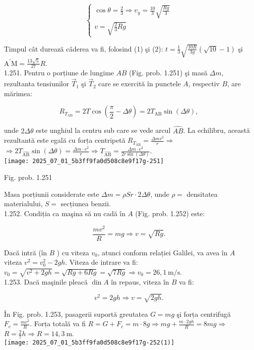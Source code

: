 \[
\left\{\begin{array}{l}
\cos \theta=\frac{2}{3} \Rightarrow v_{y}=\frac{10}{3} \sqrt{\frac{R g}{3}}  \tag{2}\\
v=\sqrt{\frac{2}{3} R g}
\end{array}\right.
\]

Timpul cât durează cǎderea va fi, folosind (1) şi (2): $t=\frac{1}{3} \sqrt{\frac{10 R}{3 g}}(\sqrt{10}-1)$ şi $\mathrm{A}^{\prime} \mathrm{M}=\frac{13 \sqrt{5}}{27} R$.\\
1.251. Pentru o porțiune de lungime $A B$ (Fig. prob. 1.251) şi masă $\Delta m$, rezultanta tensiunilor $\vec{T}_{1}$ şi $\vec{T}_{2}$ care se exercită în punctele $A$, respectiv $B$, are mărimea:

$$
R_{T_{\mathrm{AB}}}=2 T \cos \left(\frac{\pi}{2}-\Delta \theta\right)=2 T_{\mathrm{AB}} \sin (\Delta \theta),
$$

unde $2 \Delta \theta$ este unghiul la centru sub care se vede arcul $\hat{A B}$. La echilibru, această rezultantă este egală cu forța centripetă $R_{T_{\mathrm{AB}}}=\frac{\Delta m v^{2}}{r} \Rightarrow$\\
$\Rightarrow 2 T_{\hat{\mathrm{AB}}} \sin (\Delta \theta)=\frac{\Delta m \cdot v^{2}}{r} \Rightarrow T_{\hat{\mathrm{AB}}}=\frac{\Delta m \cdot v^{2}}{2 r \sin (\Delta \theta)}$.\\
\texttt{[image: 2025\_07\_01\_5b3ff9fa0d508c8e9f17g-251]}

Fig. prob. 1.251

Masa porțiunii considerate este $\Delta m=\rho S r \cdot 2 \Delta \theta$, unde $\rho=$ densitatea materialului, $S=$ secțiunea benzii.\\
1.252. Condiția ca maşina să nu cadă în $A$ (Fig. prob. 1.252) este:

$$
\frac{m v^{2}}{R}=m g \Rightarrow v=\sqrt{R g} .
$$

Dacă intră (în $B$ ) cu viteza $v_{0}$, atunci conform relației Galilei, va avea în $A$ viteza $v^{2}=v_{0}^{2}-2 g h$. Viteza de intrare va fi:\\
$v_{0}=\sqrt{v^{2}+2 g h}=\sqrt{R g+6 R g}=\sqrt{7 R g} \Rightarrow v_{0}=26,1 \mathrm{~m} / \mathrm{s}$.\\
1.253. Dacă maşinile pleacă $\operatorname{din} A$ în repaus, viteza în $B$ va fi:

$$
v^{2}=2 g h \Rightarrow v=\sqrt{2 g h} .
$$

În Fig. prob. 1.253, pasagerii suportă greutatea $G=m g$ şi forța centrifugă $F_{c}=\frac{m v^{2}}{R}$. Forța totală va fi $R=G+F_{c}=m \cdot 8 g \Rightarrow m g+\frac{m \cdot 2 g h}{R}=8 m g \Rightarrow$ $R=\frac{2}{7} h \Rightarrow R=14,3 \mathrm{~m}$.\\
\texttt{[image: 2025\_07\_01\_5b3ff9fa0d508c8e9f17g-252(1)]}

